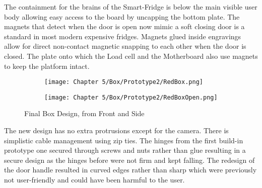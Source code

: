 The containment for the brains of the Smart-Fridge is below the main visible user body allowing easy access to the board by uncapping the bottom plate.
The magnets that detect when the door is open now mimic a soft closing door is a standard in most modern expensive fridges.
Magnets glued inside engravings allow for direct non-contact magnetic snapping to each other when the door is closed.
The plate onto which the Load cell and the Motherboard also use magnets to keep the platform intact.

\begin{figure}[H]
    \begin{subfigure}{.5\textwidth}
        \centering
        \texttt{[image: Chapter 5/Box/Prototype2/RedBox.png]}
    \end{subfigure}%
    \begin{subfigure}{.5\textwidth}
        \centering
        \texttt{[image: Chapter 5/Box/Prototype2/RedBoxOpen.png]}
    \end{subfigure}
    \caption{Final Box Design, from Front and Side}
\end{figure}

The new design has no extra protrusions except for the camera.
There is simplistic cable management using zip ties.
The hinges from the first build-in prototype one secured through screws and nuts rather than glue resulting in a secure design as the hinges before were not firm and kept falling.
The redesign of the door handle resulted in curved edges rather than sharp which were previously not user-friendly and could have been harmful to the user.